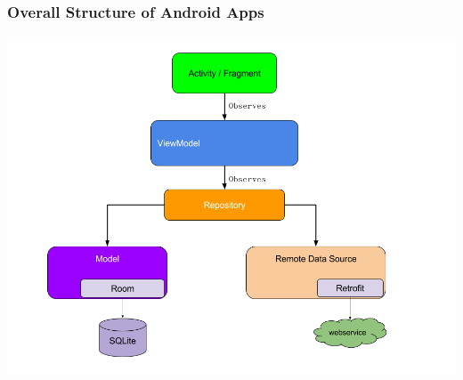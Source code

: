\documentclass{beamer}
\begin{document}
	\begin{frame}
		\frametitle{Overall Structure of Android Apps}
		\includegraphics[width=1\textwidth]{architecture_observes.png}
	\end{frame}
	
\end{document}
